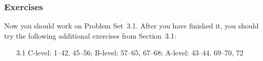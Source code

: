 \documentclass[serif,ignorenonframetext]{beamer}
\begin{document}
\begin{frame}
  \frametitle{Exercises}
  Now you should work on Problem Set~3.1.  After you have finished it,
  you should try the following additional exercises from Section~3.1:
  \begin{itemize}
  \item[3.1] 
    C-level: 1--42, 45--56; 
    B-level: 57--65, 67--68; 
    A-level: 43--44, 69--70, 72
  \end{itemize}
\end{frame}
\end{document}
